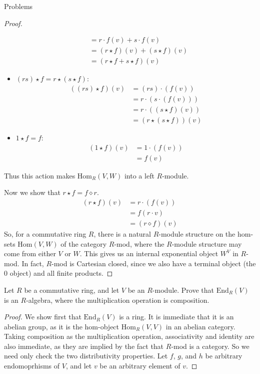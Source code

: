 \documentclass[12pt]{article}
\theoremstyle{definition}
\newenvironment{problem}[2][Problem]{\begin{trivlist}
\item[\hskip \labelsep {\bfseries #1}\hskip \labelsep {\bfseries #2.}]}{\end{trivlist}}
\begin{document}
\begin{section}{Problems}
\begin{proof}
\begin{itemize}
\begin{align*}
					&= r \cdot f(v) + s \cdot f(v)\\
					&= (r \star f)(v) + (s \star f)(v)\\
					&= (r \star f + s \star f)(v)
				\end{align*}
			\item $(rs) \star f = r \star (s \star f)$:
				\begin{align*}
					((rs) \star f)(v) &= (rs)\cdot (f(v))\\
					&= r \cdot (s \cdot (f(v)))\\
					&= r \cdot ((s \star f)(v))\\
					&= (r \star (s \star f))(v)
				\end{align*}
			\item $1 \star f = f$:
				\begin{align*}
					(1 \star f)(v) &= 1 \cdot (f(v))\\
					&= f(v)
				\end{align*}
		\end{itemize}
		Thus this action makes $\text{Hom}_R(V,W)$ into a left $R$-module.
		\par Now we show that $r \star f = f \diamond r$. 
		\begin{align*}
			(r \star f)(v) &= r \cdot (f(v))\\
			&= f(r \cdot v) \\
			&= (r \diamond f)(v)
		\end{align*}
		So, for a commutative ring $R$, there is a natural $R$-module structure on the hom-sets $\text{Hom}(V,W)$ of the category $R$-mod, where the $R$-module structure may come from either $V$ or $W$. This gives us an internal exponential object $W^V$ in $R$-mod. In fact, $R$-mod is Cartesian closed, since we also have a terminal object (the $0$ object) and all finite products.
	\end{proof}
	\begin{problem}{2}
		Let $R$ be a commutative ring, and let $V$ be an $R$-module. Prove that $\text{End}_R(V)$ is an $R$-algebra, where the multiplication operation is composition.
	\end{problem}
	\begin{proof}
		We show first that $\text{End}_R(V)$ is a ring. It is immediate that it is an abelian group, as it is the hom-object $\text{Hom}_R(V,V)$ in an abelian category. Taking composition as the multiplication operation, associativity and identity are also immediate, as they are implied by the fact that $R$-mod is a category. So we need only check the two distributivity properties. Let $f$, $g$, and $h$ be arbitrary endomoprhisms of $V$, and let $v$ be an arbitrary element of $v$.

\end{proof}
\end{section}
\end{document}
